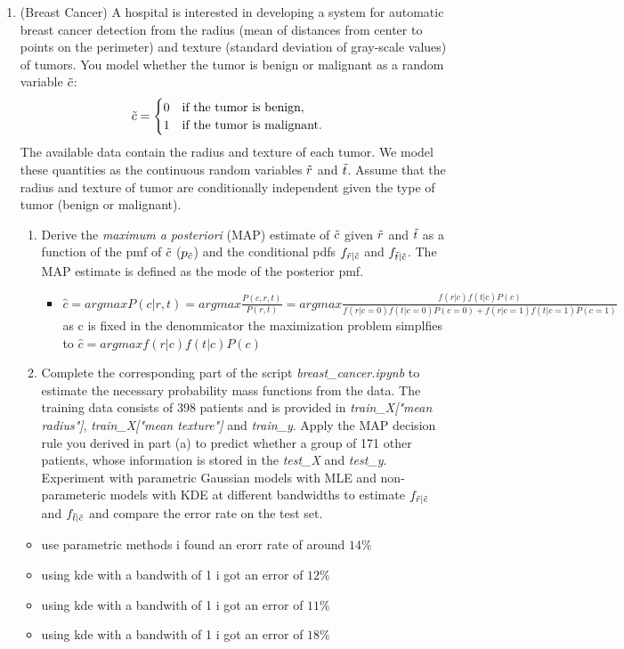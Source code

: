 \documentclass[12pt,twoside]{article}
\begin{document}
\begin{enumerate}
\item (Breast Cancer)
A hospital is interested in developing a system for automatic breast cancer detection from the radius (mean of distances from center to points on the perimeter) and texture (standard deviation of gray-scale values) of tumors. You model whether the tumor is benign or malignant as a random variable $\tilde{ c }$:
\begin{align*}
\tilde{ c } = \begin{cases}
0 \quad \text{if the tumor is benign},\\
1 \quad \text{if the tumor is malignant}.
\end{cases} 
\end{align*}
The available data contain the radius and texture of each tumor. We model these quantities as the continuous random variables $\tilde{ r }$ and $\tilde{ t }$. Assume that the radius and texture of tumor are conditionally independent given the type of tumor (benign or malignant). 

\begin{enumerate}
\item Derive the \emph{maximum a posteriori} (MAP) estimate of $\tilde{ c }$ given $\tilde{ r }$ and $\tilde{ t }$ as a function of the pmf of $\tilde{ c }$ ($ p_{\tilde{ c }}$) and the conditional pdfs $f_{\tilde{ r }|\tilde{ c }}$ and $f_{\tilde{ t }|\tilde{ c }}$. The MAP estimate is defined as the mode of the posterior pmf.

\begin{itemize}
    \item $\hat{c}=argmaxP(c|r,t)=argmax\frac{P(c,r,t)}{P(r,t)}=argmax\frac{f(r|c)f(t|c)P(c)}{f(r|c=0)f(t|c=0)P(c=0)+f(r|c=1)f(t|c=1)P(c=1)}$ as c is fixed in the denommicator the maximization problem simplfies to $\hat{c}=argmaxf(r|c)f(t|c)P(c)$
\end{itemize}


\item

Complete the corresponding part of the script \emph{breast\_cancer.ipynb} to estimate the necessary probability mass functions from the data. The training data consists of 398 patients and is provided in \emph{train\_X["mean radius"]}, \emph{train\_X["mean texture"]} and \emph{train\_y}. 
Apply the MAP decision rule you derived in part (a) to predict whether a group of 171 other patients, whose information is stored in the \emph{test\_X} and \emph{test\_y}. Experiment with parametric Gaussian models with MLE and non-parameteric models with KDE at different bandwidths to estimate $f_{\tilde{ r }|\tilde{ c }}$ and $f_{\tilde{ t }|\tilde{ c }}$ and compare the error rate on the test set.
\end{enumerate}
\begin{itemize}
    \item use parametric methods i found an erorr rate of around $14\%$
    \item using kde with a bandwith of 1 i got an error of $12\%$
    \item using kde with a bandwith of 1 i got an error of $11\%$
    \item using kde with a bandwith of 1 i got an error of $18\%$
\end{itemize}
\end{enumerate}
\end{document}
